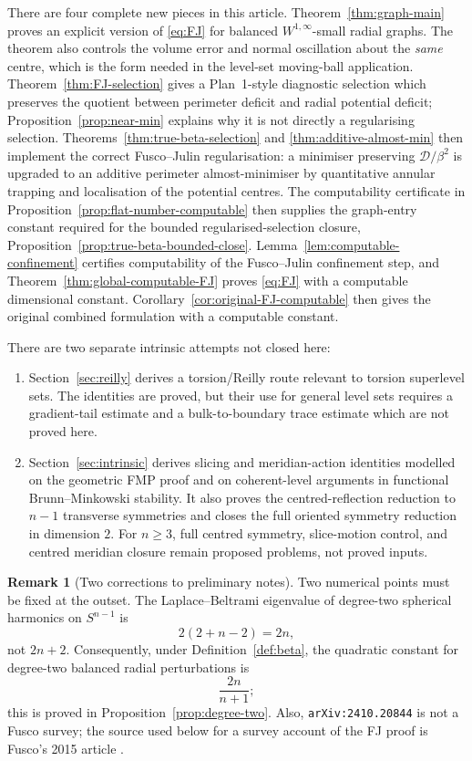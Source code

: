 \documentclass[11pt]{amsart}
\theoremstyle{definition}
\newtheorem{remark}[theorem]{Remark}
\newcommand{\Def}{\mathcal D}
\begin{document}
There are four complete new pieces in this article.
Theorem~\ref{thm:graph-main} proves an explicit version of
\eqref{eq:FJ} for balanced \(W^{1,\infty}\)-small radial graphs.  The theorem
also controls the volume error and normal oscillation about the \emph{same}
centre, which is the form needed in the level-set moving-ball application.
Theorem~\ref{thm:FJ-selection} gives a Plan~1-style diagnostic selection
which preserves the quotient between perimeter deficit and radial potential
deficit; Proposition~\ref{prop:near-min} explains why it is not directly a
regularising selection.  Theorems~\ref{thm:true-beta-selection} and
\ref{thm:additive-almost-min} then implement the correct Fusco--Julin
regularisation: a minimiser preserving \(\Def/\beta^2\) is upgraded to an
additive perimeter almost-minimiser by quantitative annular trapping and
localisation of the potential centres.
The computability certificate in
Proposition~\ref{prop:flat-number-computable} then supplies the graph-entry
constant required for the bounded regularised-selection closure,
Proposition~\ref{prop:true-beta-bounded-close}.
Lemma~\ref{lem:computable-confinement} certifies computability of the
Fusco--Julin confinement step, and
Theorem~\ref{thm:global-computable-FJ} proves \eqref{eq:FJ} with a
computable dimensional constant.  Corollary~\ref{cor:original-FJ-computable}
then gives the original combined formulation with a computable constant.

There are two separate intrinsic attempts not closed here:
\begin{enumerate}[label=\textnormal{(\roman*)},leftmargin=2.2em]
\item Section~\ref{sec:reilly} derives a torsion/Reilly route relevant to
torsion superlevel sets.  The identities are proved, but their use for general
level sets requires a gradient-tail estimate and a bulk-to-boundary trace
estimate which are not proved here.
\item Section~\ref{sec:intrinsic} derives slicing and meridian-action
identities modelled on the geometric FMP proof and on coherent-level
arguments in functional Brunn--Minkowski stability.  It also proves the
centred-reflection reduction to \(n-1\) transverse symmetries and closes
the full oriented symmetry reduction in dimension \(2\).  For
\(n\ge3\), full centred symmetry, slice-motion control, and centred
meridian closure remain proposed problems, not proved inputs.
\end{enumerate}

\begin{remark}[Two corrections to preliminary notes]\label{rem:corrections}
Two numerical points must be fixed at the outset.  The Laplace--Beltrami
eigenvalue of degree-two spherical harmonics on \(S^{n-1}\) is
\[
   2(2+n-2)=2n,
\]
not \(2n+2\).  Consequently, under Definition~\ref{def:beta}, the quadratic
constant for degree-two balanced radial perturbations is
\[
   \frac{2n}{n+1};
\]
this is proved in Proposition~\ref{prop:degree-two}.  Also,
\texttt{arXiv:2410.20844} is not a Fusco survey; the source used below for a
survey account of the FJ proof is Fusco's 2015 article
\cite{FuscoSurvey}.
\end{remark}
\end{document}
